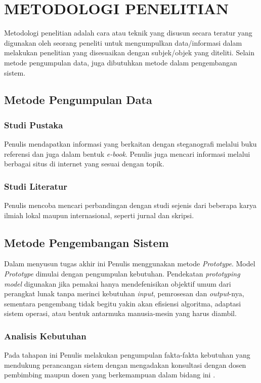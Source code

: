 
\chapter{METODOLOGI PENELITIAN}

Metodologi penelitian adalah cara atau teknik yang disusun secara teratur yang digunakan oleh seorang peneliti untuk mengumpulkan data/informasi dalam melakukan penelitian yang disesuaikan dengan subjek/objek yang diteliti. Selain metode pengumpulan data, juga dibutuhkan metode dalam pengembangan sistem. 
\section{Metode Pengumpulan Data}
	\subsection{Studi Pustaka}
	Penulis mendapatkan informasi yang berkaitan dengan steganografi melalui buku referensi dan juga dalam bentuk \emph{e-book}. Penulis juga mencari informasi melalui berbagai situs di internet yang sesuai dengan topik.	
	\subsection{Studi Literatur}
	Penulis mencoba mencari perbandingan dengan studi sejenis dari beberapa karya ilmiah lokal maupun internasional, seperti jurnal dan skripsi.

\section{Metode Pengembangan Sistem}
Dalam menyusun tugas akhir ini Penulis menggunakan metode \emph{Prototype}. Model \emph{Prototype} dimulai dengan pengumpulan kebutuhan. Pendekatan \emph{prototyping model} digunakan jika pemakai hanya mendefenisikan objektif umum dari perangkat lunak tanpa merinci kebutuhan \emph{input}, pemrosesan dan \emph{output}-nya, sementara pengembang tidak begitu yakin akan efisiensi algoritma, adaptasi sistem operasi, atau bentuk antarmuka manusia-mesin yang harus diambil. 
	\subsection{Analisis Kebutuhan}
	Pada tahapan ini Penulis melakukan pengumpulan fakta-fakta kebutuhan yang mendukung perancangan sistem dengan mengadakan konsultasi dengan dosen pembimbing maupun dosen yang berkemampuan dalam bidang ini .

